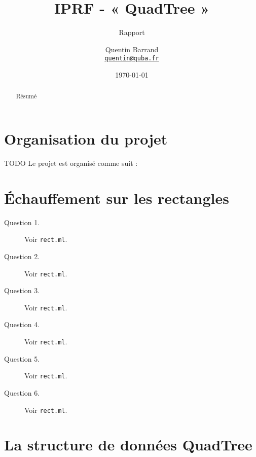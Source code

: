 \documentclass[11pt]{scrartcl}
\newcommand{\filename}[1]{\texttt{\textcolor{RawSienna}{#1}}}
\begin{document}
\title{\textbf{IPRF - « QuadTree »}}
\subtitle{Rapport}

\author{Quentin Barrand\\
		\href{mailto:quentin@quba.fr}{\texttt{quentin@quba.fr}}}
		
\date{\today}

\maketitle

\begin{abstract}
Résumé
\end{abstract}

\break

\section*{Organisation du projet}

TODO
Le projet est organisé comme suit :


\section{Échauffement sur les rectangles}

\begin{description}
\item[Question 1.] Voir \filename{rect.ml}.

\item[Question 2.] Voir \filename{rect.ml}.

\item[Question 3.] Voir \filename{rect.ml}.

\item[Question 4.] Voir \filename{rect.ml}.

\item[Question 5.] Voir \filename{rect.ml}.

\item[Question 6.] Voir \filename{rect.ml}.
\end{description}

\section{La structure de données QuadTree}
\end{document}

